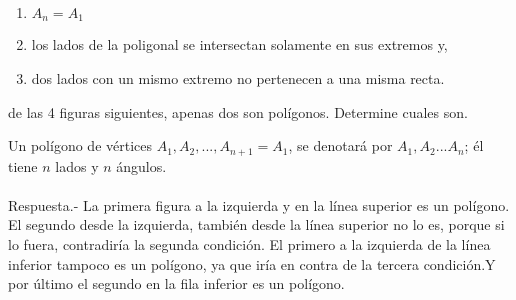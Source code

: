 \documentclass[10pt]{article}
\begin{document}
\begin{enumerate}
\begin{enumerate}[\bfseries a)]
		\item $A_n=A_1$

		\item los lados de la poligonal se intersectan solamente en sus extremos y, 

		\item dos lados con un mismo extremo no pertenecen a una misma recta. 
	    \end{enumerate}
	de las 4 figuras siguientes, apenas dos son polígonos. Determine cuales son.

	    \begin{multicols}{2}
		\begin{center}
		    


		\end{center}
	    \end{multicols}
	    Un polígono de vértices $A_1,A_2,...,A_{n+1}=A_1$, se denotará por $A_1,A_2...A_n$; él tiene $n$ lados y $n$ ángulos.\\\\

	    Respuesta.-\; La primera figura a la izquierda y en la línea superior es un polígono. El segundo desde la izquierda, también desde la línea superior no lo es, porque si lo fuera, contradiría la segunda condición. El primero a la izquierda de la línea inferior tampoco es un polígono, ya que iría en contra de la tercera condición.Y por último el segundo en la fila inferior es un polígono.\\\\
 

\end{enumerate}
\end{document}
